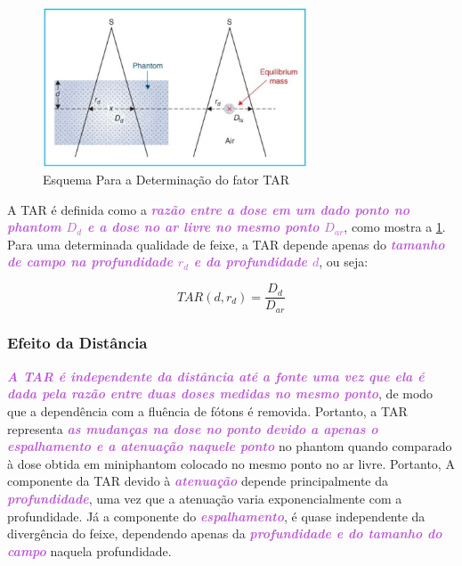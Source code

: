 \documentclass[11pt,a4paper]{article}
\begin{document}
	\begin{figure}[h]
		\centering
		\includegraphics[width=0.7\textwidth]{Imagens/esquemaTAR.JPG}
		\caption{Esquema Para a Determinação do fator TAR}
		\label{fig:esquemaTAR}
	\end{figure}

	A TAR é definida como a \textcolor{MediumOrchid}{\textbf{\textit{razão entre a dose em um dado ponto no phantom $D_d$ e a dose no ar livre no mesmo ponto $D_{ar}$}}}, como mostra a \ref{fig:esquemaTAR}. Para uma determinada qualidade de feixe, a TAR depende apenas do \textcolor{MediumOrchid}{\textbf{\textit{tamanho de campo na profundidade $r_d$ e da profundidade $d$}}}, ou seja:

		\begin{equation}
			TAR(d, r_d) = \frac{D_d}{D_{ar}}
		\end{equation}


	\subsubsection*{Efeito da Distância}

	\textcolor{MediumOrchid}{\textbf{\textit{A TAR é independente da distância até a fonte uma vez que ela é dada pela razão entre duas doses medidas no mesmo ponto}}}, de modo que a dependência com a fluência de fótons é removida. Portanto, a TAR representa \textcolor{MediumOrchid}{\textbf{\textit{as mudanças na dose no ponto devido a apenas o espalhamento e a atenuação naquele ponto}}} no phantom quando comparado à dose obtida em  miniphantom colocado no mesmo ponto no ar livre. Portanto, A componente da TAR devido à \textcolor{MediumOrchid}{\textbf{\textit{atenuação}}} depende principalmente da \textcolor{MediumOrchid}{\textbf{\textit{profundidade}}}, uma vez que a atenuação varia exponencialmente com a profundidade. Já a componente do \textcolor{MediumOrchid}{\textbf{\textit{espalhamento}}}, é quase independente da divergência do feixe, dependendo apenas da \textcolor{MediumOrchid}{\textbf{\textit{profundidade e do tamanho do campo}}} naquela profundidade.
\end{document}
